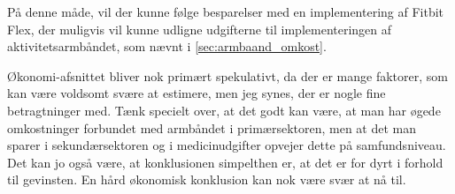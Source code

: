 På denne måde, vil der kunne følge besparelser med en implementering af Fitbit Flex, der muligvis vil kunne udligne udgifterne til implementeringen af aktivitetsarmbåndet, som nævnt i \autoref{sec:armbaand_omkost}. 

Økonomi-afsnittet bliver nok primært spekulativt, da der er mange faktorer, som kan være voldsomt svære at estimere, men jeg synes, der er nogle fine betragtninger med. Tænk specielt over, at det godt kan være, at man har øgede omkostninger forbundet med armbåndet i primærsektoren, men at det man sparer i sekundærsektoren og i medicinudgifter opvejer dette på samfundsniveau. Det kan jo også være, at konklusionen simpelthen er, at det er for dyrt i forhold til gevinsten. En hård økonomisk konklusion kan nok være svær at nå til.